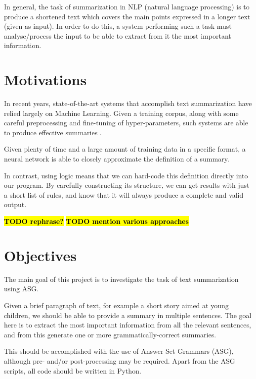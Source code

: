 \label{chapter:introduction}

In general, the task of summarization in NLP (natural language processing) is to produce a shortened text which covers the main points expressed in a longer text (given as input). In order to do this, a system performing such a task must analyse/process the input to be able to extract from it the most important information.

\section{Motivations}

In recent years, state-of-the-art systems that accomplish text summarization have relied largely on Machine Learning. Given a training corpus, along with some careful preprocessing and fine-tuning of hyper-parameters, such systems are able to produce effective summaries \cite{kiyani_survey_2017}.

Given plenty of time and a large amount of training data in a specific format, a neural network is able to closely approximate the definition of a summary.

In contrast, using logic means that we can hard-code this definition directly into our program. By carefully constructing its structure, we can get results with just a short list of rules, and know that it will always produce a complete and valid output.

\textcolor{red}{\textbf{\hl{TODO rephrase?}}}
\textcolor{red}{\textbf{\hl{TODO mention various approaches}}}

\section{Objectives}

The main goal of this project is to investigate the task of text summarization using ASG.

Given a brief paragraph of text, for example a short story aimed at young children, we should be able to provide a summary in multiple sentences. The goal here is to extract the most important information from all the relevant sentences, and from this generate one or more grammatically-correct summaries.

This should be accomplished with the use of Answer Set Grammars (ASG), although pre- and/or post-processing may be required. Apart from the ASG scripts, all code should be written in Python.

%

